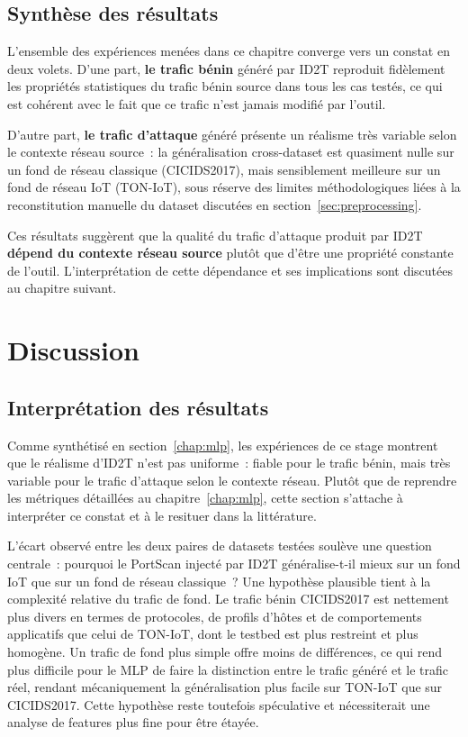 \documentclass[12pt, a4paper]{report}
\begin{document}
\section{Synthèse des résultats}
 
L'ensemble des expériences menées dans ce chapitre converge vers un
constat en deux volets. D'une part, \textbf{le trafic bénin} généré par
ID2T reproduit fidèlement les propriétés statistiques du trafic bénin
source dans tous les cas testés, ce qui est cohérent avec le fait que
ce trafic n'est jamais modifié par l'outil.
 
D'autre part, \textbf{le trafic d'attaque} généré présente un réalisme
très variable selon le contexte réseau source~: la généralisation
cross-dataset est quasiment nulle sur un fond de réseau classique
(CICIDS2017), mais sensiblement meilleure sur un fond de réseau IoT
(TON-IoT), sous réserve des limites méthodologiques liées à la
reconstitution manuelle du dataset discutées en
section~\ref{sec:preprocessing}.
 
Ces résultats suggèrent que la qualité du trafic d'attaque produit par
ID2T \textbf{dépend du contexte réseau source} plutôt que d'être une
propriété constante de l'outil. L'interprétation de cette dépendance
et ses implications sont discutées au chapitre suivant.
 
 
 
 
 
\chapter{Discussion}
\label{chap:discussion}
 
\section{Interprétation des résultats}
 
Comme synthétisé en section~\ref{chap:mlp}, les expériences de ce
stage montrent que le réalisme d'ID2T n'est pas uniforme~: fiable pour
le trafic bénin, mais très variable pour le trafic d'attaque selon le
contexte réseau. Plutôt que de reprendre les métriques détaillées au
chapitre~\ref{chap:mlp}, cette section s'attache à interpréter ce
constat et à le resituer dans la littérature.
 
L'écart observé entre les deux paires de datasets testées soulève une
question centrale~: pourquoi le PortScan injecté par ID2T généralise-t-il
mieux sur un fond IoT que sur un fond de réseau classique~? Une
hypothèse plausible tient à la complexité relative du trafic de fond.
Le trafic bénin CICIDS2017 est nettement plus divers en termes de
protocoles, de profils d'hôtes et de comportements applicatifs que
celui de TON-IoT, dont le testbed est plus restreint et plus homogène.
Un trafic de fond plus simple offre moins de différences, ce qui rend plus difficile pour le MLP de faire la distinction entre le trafic généré et le trafic réel, rendant mécaniquement la généralisation
plus facile sur TON-IoT que sur CICIDS2017. Cette hypothèse reste
toutefois spéculative et nécessiterait une analyse de features plus
fine pour être étayée.
 
\end{document}
